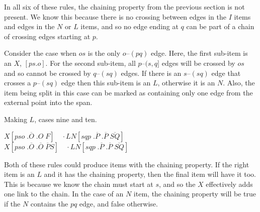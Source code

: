 In all six of these rules, the chaining property from the previous section is not present.
We know this because there is no crossing between edges in the $I$ items and edges in the $N$ or $L$ items, and so no edge ending at $q$ can be part of a chain of crossing edges starting at $p$.

\begin{center}
\end{center}

Consider the case when $os$ is the only $o$--$(pq)$ edge.
Here, the first sub-item is an $X$, $[ps.o]$.
For the second sub-item, all $p$--$(s, q]$ edges will be crossed by $os$ and so cannot be crossed by $q$--$(sq)$ edges.
If there is an $s$--$(sq)$ edge that crosses a $p$--$(sq)$ edge then this sub-item is an $L$, otherwise it is an $N$.
Also, the item being split in this case can be marked as containing only one edge from the external point into the span.

\begin{finalEquation}
\caption{Making $L$, cases nine and ten.}
  $X[pso \; .\overline{O} \; .O \; F] \quad \cdotp LN[sqp \; .\overline{P} \; .\overline{P} \; \overline{SQ}]$ \\
  $X[pso \; .\overline{O} \; .\overline{O} \; \overline{P}S] \quad \cdotp LN[sqp \; .\overline{P} \; .\overline{P} \; \overline{SQ}]$
\end{finalEquation}

Both of these rules could produce items with the chaining property.
If the right item is an $L$ and it has the chaining property, then the final item will have it too.
This is because we know the chain must start at $s$, and so the $X$ effectively adds one link to the chain.
In the case of an $N$ item, the chaining property will be true if the $N$ contains the $pq$ edge, and false otherwise.

\begin{center}
\end{center}

